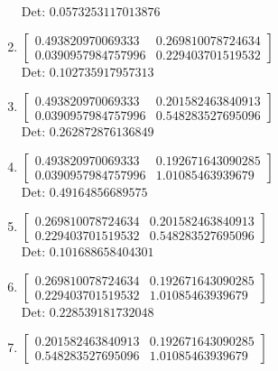 \documentclass[12pt]{article}
\begin{document}
\begin{enumerate}
Det: $0.0573253117013876$\\

\item $\displaystyle \left[\begin{matrix}0.493820970069333 & 0.269810078724634\\0.0390957984757996 & 0.229403701519532\end{matrix}\right]$\\

Det: $0.102735917957313$\\

\item $\displaystyle \left[\begin{matrix}0.493820970069333 & 0.201582463840913\\0.0390957984757996 & 0.548283527695096\end{matrix}\right]$\\

Det: $0.262872876136849$\\

\item $\displaystyle \left[\begin{matrix}0.493820970069333 & 0.192671643090285\\0.0390957984757996 & 1.01085463939679\end{matrix}\right]$\\

Det: $0.49164856689575$\\

\item $\displaystyle \left[\begin{matrix}0.269810078724634 & 0.201582463840913\\0.229403701519532 & 0.548283527695096\end{matrix}\right]$\\

Det: $0.101688658404301$\\

\item $\displaystyle \left[\begin{matrix}0.269810078724634 & 0.192671643090285\\0.229403701519532 & 1.01085463939679\end{matrix}\right]$\\

Det: $0.228539181732048$\\

\item $\displaystyle \left[\begin{matrix}0.201582463840913 & 0.192671643090285\\0.548283527695096 & 1.01085463939679\end{matrix}\right]$\\


\end{enumerate}
\end{document}
